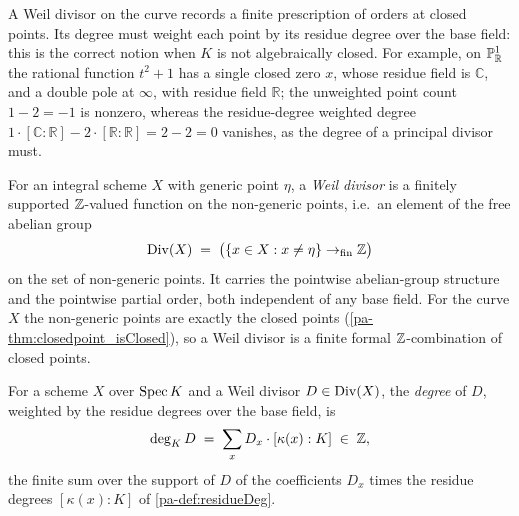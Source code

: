 A Weil divisor on the curve records a finite prescription of orders at closed points. Its degree
must weight each point by its residue degree over the base field: this is the correct notion when
\(K\) is not algebraically closed. For example, on \(\mathbb{P}^1_{\mathbb{R}}\) the rational function
\(t^2 + 1\) has a single closed zero \(x\), whose residue field is \(\mathbb{C}\), and a double
pole at \(\infty\), with residue field \(\mathbb{R}\); the unweighted point count \(1 - 2 = -1\)
is nonzero, whereas the residue-degree weighted degree
\(1 \cdot [\mathbb{C} : \mathbb{R}] - 2 \cdot [\mathbb{R} : \mathbb{R}] = 2 - 2 = 0\)
vanishes, as the degree of a principal divisor must.

\begin{definition}
  \label{pa-def:curveDivisor}
  \leanok

  For an integral scheme \(X\) with generic point \(\eta\), a \emph{Weil divisor} is a finitely
  supported \(\mathbb{Z}\)-valued function on the non-generic points, i.e.\ an element of the free abelian
  group
  \[
    \operatorname{Div}(X) \;=\; \bigl(\{ x \in X : x \neq \eta \} \to_{\mathrm{fin}} \mathbb{Z}\bigr)
  \]
  on the set of non-generic points. It carries the pointwise abelian-group structure and the
  pointwise partial order, both independent of any base field. For the curve \(X\) the
  non-generic points are exactly the closed points (\ref{pa-thm:closedpoint_isClosed}), so a Weil
  divisor is a finite formal \(\mathbb{Z}\)-combination of closed points.
\end{definition}

\begin{definition}
  \label{pa-def:curveDivisor_deg}
  \leanok

  For a scheme \(X\) over \(\operatorname{Spec} K\) and a Weil divisor \(D \in \operatorname{Div}(X)\), the \emph{degree} of
  \(D\), weighted by the residue degrees over the base field, is
  \[
    \deg_K D \;=\; \sum_{x} D_x \cdot [\kappa(x) : K] \;\in\; \mathbb{Z} ,
  \]
  the finite sum over the support of \(D\) of the coefficients \(D_x\) times the residue degrees
  \([\kappa(x) : K]\) of \ref{pa-def:residueDeg}.
\end{definition}

